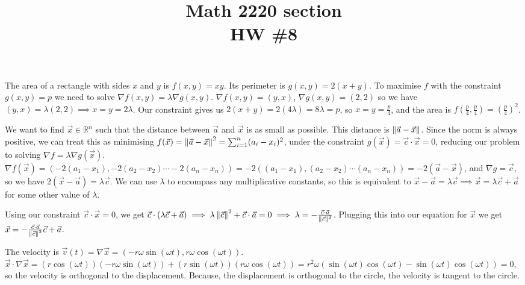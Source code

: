 
\newcommand{\hwnumber}{8}

\title{Math 2220 section \sectionnum\\ HW \#\hwnumber}
\author{\name}
\maketitle


The area of a rectangle with sides $x$ and $y$ is $f(x, y) = xy$. Its perimeter is $g(x, y) = 2(x + y)$. To maximise $f$ with the constraint $g(x, y) = p$ we need to solve $\nabla f(x, y) = \lambda \nabla g(x, y)$. $\nabla f(x, y) = (y, x)$, $\nabla g(x, y) = (2, 2)$ so we have $(y, x) = \lambda (2, 2) \implies x = y = 2\lambda$. Our constraint gives us $2(x + y) = 2(4\lambda) = 8\lambda = p$, so $x = y = \frac{p}{4}$, and the area is $f(\frac{p}{4}, \frac{p}{4}) = \left(\frac{p}{4}\right)^2$.

We want to find $\vec{x} \in \mathbb{R}^n$ such that the distance between $\vec{a}$ and $\vec{x}$ is as small as possible. This distance is $\left\lVert\vec{a} - \vec{x}\right\rVert$. Since the norm is always positive, we can treat this as minimising $f(\vec{x}) = \left\lVert\vec{a} - \vec{x}\right\rVert^2 = \sum_{i = 1}^n (a_i - x_i)^2$, under the constraint $g(\vec{x}) = \vec{c} \cdot \vec{x} = 0$, reducing our problem to solving $\nabla f = \lambda \nabla g(\vec{x})$. $\nabla f(\vec{x}) = (-2(a_1 - x_1), -2(a_2 - x_2) \cdots -2(a_n - x_n)) = -2((a_1 - x_1), (a_2 - x_2) \cdots (a_n - x_n)) = -2(\vec{a} - \vec{x})$, and $\nabla g = \vec{c}$, so we have $2(\vec{x} - \vec{a}) = \lambda \vec{c}$. We can use $\lambda$ to encompass any multiplicative constants, so this is equivalent to $\vec{x} - \vec{a} = \lambda \vec{c} \implies \vec{x} = \lambda \vec{c} + \vec{a}$ for some other value of $\lambda$.

Using our constraint $\vec{c} \cdot \vec{x} = 0$, we get $\vec{c} \cdot (\lambda \vec{c} + \vec{a}) \implies \lambda \left\lVert\vec{c}\right\rVert^2 + \vec{c} \cdot \vec{a} = 0 \implies \lambda = -\frac{\vec{c} \cdot \vec{a}}{\left\lVert\vec{c}\right\rVert^2}$. Plugging this into our equation for $\vec{x}$ we get $\vec{x} = -\frac{\vec{c} \cdot \vec{a}}{\left\lVert\vec{c}\right\rVert^2} \vec{c} + \vec{a}$.


The velocity is $\vec{v}(t) = \nabla \vec{x} = (-r \omega \sin(\omega t), r \omega \cos(\omega t))$. $\vec{x} \cdot \nabla \vec{x} = (r \cos(\omega t))(-r \omega \sin(\omega t)) + (r \sin(\omega t))(r \omega \cos(\omega t)) = r^2\omega(\sin(\omega t)\cos(\omega t) - \sin(\omega t)\cos(\omega t)) = 0$, so the velocity is orthogonal to the displacement. Because, the displacement is orthogonal to the circle, the velocity is tangent to the circle.

